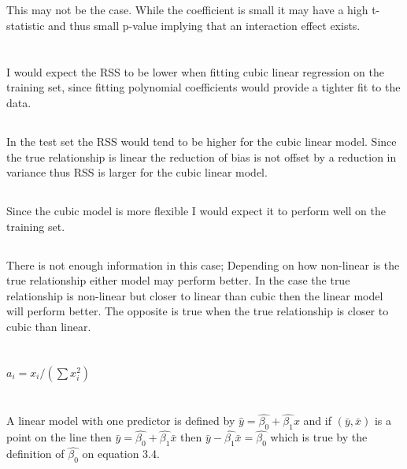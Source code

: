 \documentclass[11pt, oneside]{article}   	%
\begin{document}
  \subsection{}
  This may not be the case. While the coefficient is small it may have a high t-statistic and thus small p-value implying that an interaction effect exists.


\section{}

  \subsection{}
  I would expect the RSS to be lower when fitting cubic linear regression on the training set, since fitting polynomial coefficients would provide a tighter fit to the data.

  \subsection{}
  In the test set the RSS would tend to be higher for the cubic linear model. Since the true relationship is linear the reduction of bias is not offset by a reduction in variance thus RSS is larger for the cubic linear model.
  
    \subsection{}
Since the cubic model is more flexible I would expect it to perform well on the training set.

    \subsection{}
There is not enough information in this case; Depending on how non-linear is the true relationship either model may perform better. In the case the true relationship is non-linear but closer to linear than cubic then the linear model will perform better. The opposite is true when the true relationship is closer to cubic than linear. 

\section{}
$a_i = x_i / (\sum x_i^2)$

\section{}

A linear model with one predictor is defined by $\hat{y} = \hat{\beta_0} + \hat{\beta_1} x$ and  if $(\bar{y},\bar{x})$ is a point on the line then $\bar{y} = \hat{\beta_0} + \hat{\beta_1} \bar{x}$ then $ \bar{y} - \hat{\beta_1} \bar{x}= \hat{\beta_0}$ which is true by the definition of $\hat{\beta_0}$ on equation 3.4.
\end{document}
